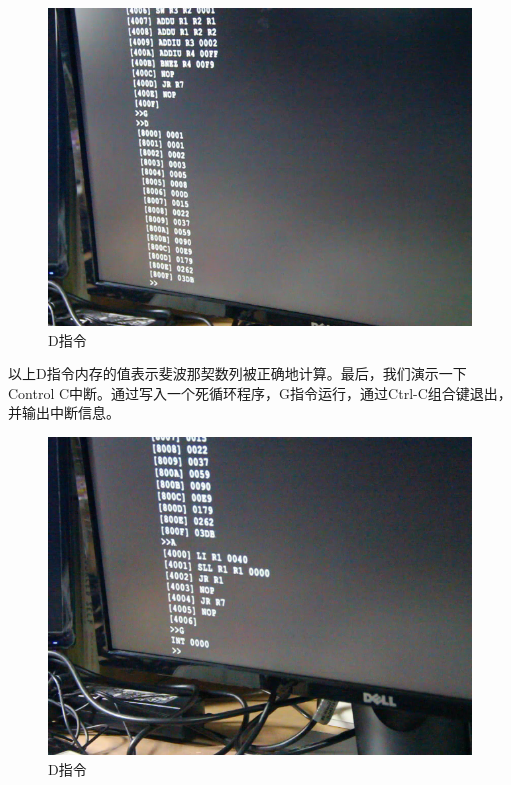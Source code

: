 \begin{figure}[H]
  \centering
  \includegraphics[width=4.5in]{Figures/picture/vlcsnap-2015-12-09-23h48m01s993.png}
  \caption{D指令}
\end{figure}

以上D指令内存的值表示斐波那契数列被正确地计算。最后，我们演示一下Control C中断。通过写入一个死循环程序，G指令运行，通过Ctrl-C组合键退出，并输出中断信息。

\begin{figure}[H]
  \centering
  \includegraphics[width=4.5in]{Figures/picture/vlcsnap-2015-12-09-23h48m27s710.png}
  \caption{D指令}
\end{figure}




